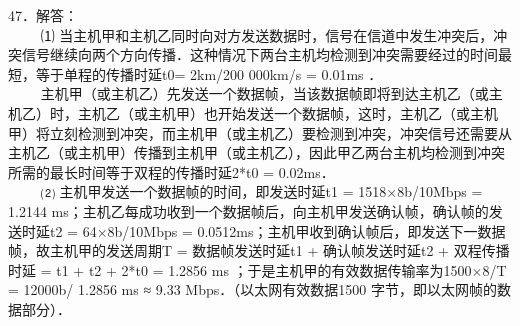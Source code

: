 47．解答： \\
$\qquad$ ⑴ 当主机甲和主机乙同时向对方发送数据时，信号在信道中发生冲突后，冲突信号继续向两个方向传播．这种情况下两台主机均检测到冲突需要经过的时间最短，等于单程的传播时延t0= 2km/200 000km/s =
0.01ms ． \\
$\qquad$ 主机甲（或主机乙）先发送一个数据帧，当该数据帧即将到达主机乙（或主机乙）时，主机乙（或主机甲）也开始发送一个数据帧，这时，主机乙（或主机甲）将立刻检测到冲突，而主机甲（或主机乙）要检测到冲突，冲突信号还需要从主机乙（或主机甲）传播到主机甲（或主机乙），因此甲乙两台主机均检测到冲突所需的最长时间等于双程的传播时延2*t0 = 0.02ms． \\
$\qquad$ ⑵ 主机甲发送一个数据帧的时间，即发送时延t1 = 1518×8b/10Mbps = 1.2144 ms；主机乙每成功收到一个数据帧后，向主机甲发送确认帧，确认帧的发送时延t2 = 64×8b/10Mbps = 0.0512ms；主机甲收到确认帧后，即发送下一数据帧，故主机甲的发送周期T = 数据帧发送时延t1 + 确认帧发送时延t2 + 双程传播时延 = t1 + t2 + 2*t0 = 1.2856 ms ；于是主机甲的有效数据传输率为1500×8/T = 12000b/ 1.2856 ms ≈ 9.33 Mbps．（以太网有效数据1500 字节，即以太网帧的数据部分）．




